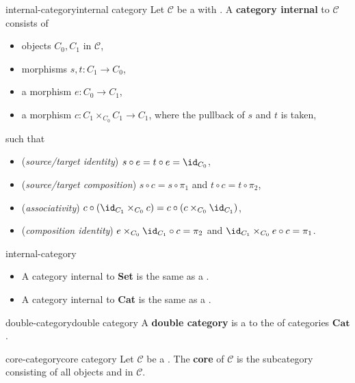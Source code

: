 \begin{topic}{internal-category}{internal category}
    Let $\mathcal{C}$ be a  with . A \textbf{category internal} to $\mathcal{C}$ consists of
    \begin{itemize}
        \item objects $C_0, C_1$ in $\mathcal{C}$,
        \item morphisms $s, t : C_1 \to C_0$,
        \item a morphism $e : C_0 \to C_1$,
        \item a morphism $c : C_1 \times_{C_0} C_1 \to C_1$, where the pullback of $s$ and $t$ is taken,
    \end{itemize}
    such that
    \begin{itemize}
        \item (\textit{source/target identity}) $s \circ e = t \circ e = \id_{C_0}$,
        \item (\textit{source/target composition}) $s \circ c = s \circ \pi_1$ and $t \circ c = t \circ \pi_2$,
        \item (\textit{associativity}) $c \circ (\id_{C_1} \times_{C_0} c) = c \circ (c \times_{C_0} \id_{C_1})$,
        \item (\textit{composition identity}) $e \times_{C_0} \id_{C_1} \circ c = \pi_2$ and $\id_{C_1} \times_{C_0} e \circ c = \pi_1$.
    \end{itemize}
\end{topic}

\begin{example}{internal-category}
    \begin{itemize}
        \item A category internal to \textbf{Set} is the same as a .
        \item A category internal to \textbf{Cat} is the same as a .
    \end{itemize}
\end{example}

\begin{topic}{double-category}{double category}
    A \textbf{double category} is a  to the  of categories  $\textbf{Cat}$.
\end{topic}

\begin{topic}{core-category}{core category}
    Let $\mathcal{C}$ be a . The \textbf{core} of $\mathcal{C}$ is the subcategory consisting of all objects and  in $\mathcal{C}$. 
\end{topic}

